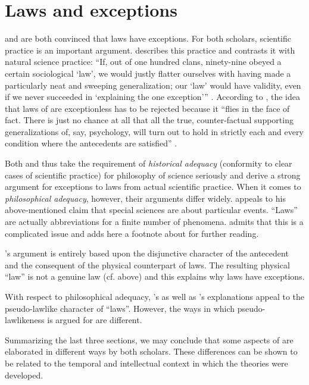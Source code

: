 \documentclass[output=paper]{langscibook}
\begin{document}
\section{Laws and exceptions}
\label{sec:elffers:lawsexceptions}

{\Sapir} and {\Fodor} are both convinced that  laws have exceptions. For both scholars, scientific practice is an important argument. {\Sapir} describes this practice and contrasts it with natural science practice: ``If, out of one  hundred clans, ninety-nine obeyed a certain sociological `law', we would justly flatter ourselves with having made a particularly neat and sweeping generalization; our `law' would have validity, even if we never succeeded in `explaining the one exception''' \citep[447]{Sapir1917}. According to {\Fodor}, the idea that laws of  are exceptionless has to be rejected because it ``flies in the face of fact. There is just no chance at all that all the true, counter-factual supporting generalizations of, say, psychology, will turn out to hold in strictly each and every condition where the antecedents are satisfied'' \citep[111]{Fodor1974}.

Both {\Sapir} and {\Fodor} thus take the requirement of \emph{historical adequacy} (conformity to clear cases of scientific practice) for philosophy of science seriously and derive a strong argument for exceptions to  laws from actual scientific practice. When it comes to \emph{philosophical adequacy}, however, their arguments differ widely. {\Sapir} appeals to his above-mentioned claim that special sciences are about particular events. ``Laws'' are actually abbreviations for a finite number of phenomena. {\Sapir} admits that this is a complicated issue and adds here a footnote about {\Rickert} for further reading.

{\Fodor}'s argument is entirely based upon the disjunctive character of the antecedent and the consequent of the physical counterpart of  laws. The resulting physical ``law'' is not a genuine law (cf.  above) and this explains why  laws have exceptions.

With respect to philosophical adequacy, {\Sapir}'s as well as {\Fodor}'s explanations appeal to the pseudo-lawlike character of  ``laws''. However, the ways in which pseudo-lawlikeness is argued for are different.

Summarizing the last three sections, we may conclude that some aspects of  are elaborated in different ways by both scholars. These differences can be shown to be related to the temporal and intellectual context in which the theories were developed.
\end{document}
